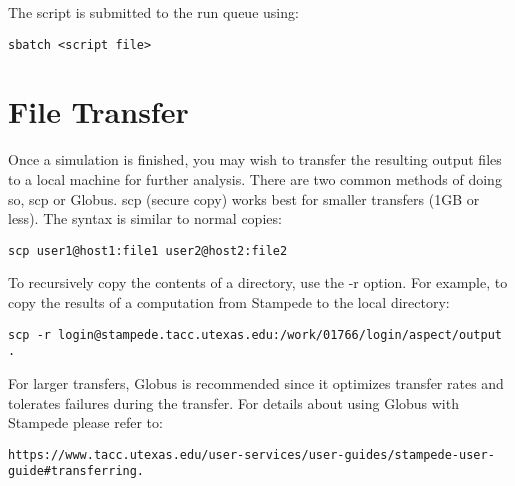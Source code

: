 \documentclass{article}
\begin{document}
The script is submitted to the run queue using: 
\begin{lstlisting}[frame=single,language=ksh]
sbatch <script file> 
\end{lstlisting}

\section{File Transfer}
Once a simulation is finished, you may wish to transfer the resulting output files to a local machine for further analysis. There are two common methods of doing so, scp or Globus. scp (secure copy) works best for smaller transfers (1GB or less). The syntax is similar to normal copies: \\

\begin{lstlisting}[frame=single,language=ksh]
scp user1@host1:file1 user2@host2:file2 
\end{lstlisting}

To recursively copy the contents of a directory, use the -r option. For example, to copy the results of a computation from Stampede to the local directory: 

\begin{lstlisting}[frame=single,language=ksh]
scp -r login@stampede.tacc.utexas.edu:/work/01766/login/aspect/output . 
\end{lstlisting}

For larger transfers, Globus is recommended since it optimizes transfer rates and tolerates
failures during the transfer. For details about using Globus with Stampede please refer to: 

\begin{lstlisting}[frame=single,language=ksh]
https://www.tacc.utexas.edu/user-services/user-guides/stampede-user-guide#transferring.
\end{lstlisting}
 

 
\end{document}
